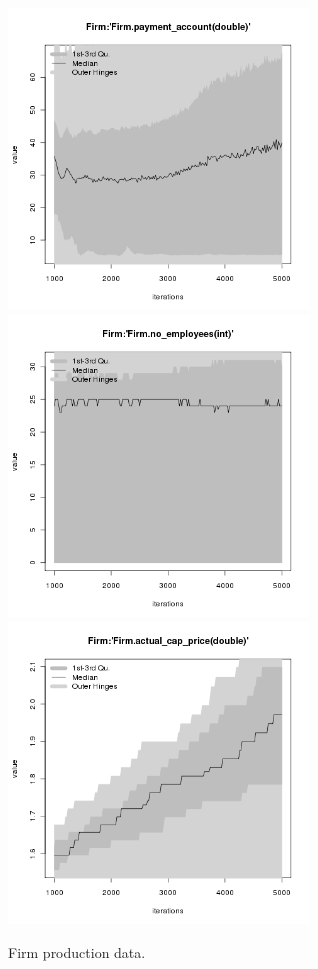 \begin{figure}[H!]
\begin{minipage}{17cm}
\includegraphics[width=8cm]{./png/tax_0.10/Firm-payment_account.png}\\
\includegraphics[width=8cm]{./png/tax_0.10/Firm-no_employees.png}
\includegraphics[width=8cm]{./png/tax_0.10/Firm-actual_cap_price.png}
\end{minipage}
\caption{Firm production data.}
\label{Figure: Firm Production}
\end{figure}

